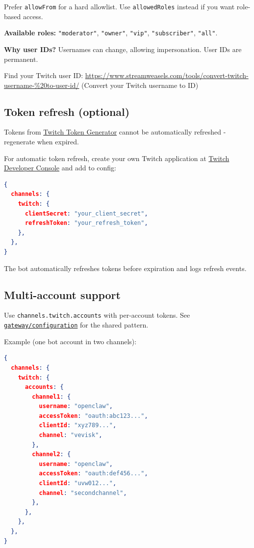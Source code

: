 Prefer \texttt{allowFrom} for a hard allowlist. Use \texttt{allowedRoles} instead if you want role-based access.

\textbf{Available roles:} \texttt{"moderator"}, \texttt{"owner"}, \texttt{"vip"}, \texttt{"subscriber"}, \texttt{"all"}.

\textbf{Why user IDs?} Usernames can change, allowing impersonation. User IDs are permanent.

Find your Twitch user ID: \href{https://www.streamweasels.com/tools/convert-twitch-username-\%20to-user-id/}{https://www.streamweasels.com/tools/convert-twitch-username-\%20to-user-id/} (Convert your Twitch username to ID)

\subsection{Token refresh (optional)}


Tokens from \href{https://twitchtokengenerator.com/}{Twitch Token Generator} cannot be automatically refreshed - regenerate when expired.

For automatic token refresh, create your own Twitch application at \href{https://dev.twitch.tv/console}{Twitch Developer Console} and add to config:

\begin{lstlisting}[language=json]
{
  channels: {
    twitch: {
      clientSecret: "your_client_secret",
      refreshToken: "your_refresh_token",
    },
  },
}
\end{lstlisting}


The bot automatically refreshes tokens before expiration and logs refresh events.

\subsection{Multi-account support}


Use \texttt{channels.twitch.accounts} with per-account tokens. See \href{/gateway/configuration}{\texttt{gateway/configuration}} for the shared pattern.

Example (one bot account in two channels):

\begin{lstlisting}[language=json]
{
  channels: {
    twitch: {
      accounts: {
        channel1: {
          username: "openclaw",
          accessToken: "oauth:abc123...",
          clientId: "xyz789...",
          channel: "vevisk",
        },
        channel2: {
          username: "openclaw",
          accessToken: "oauth:def456...",
          clientId: "uvw012...",
          channel: "secondchannel",
        },
      },
    },
  },
}
\end{lstlisting}


